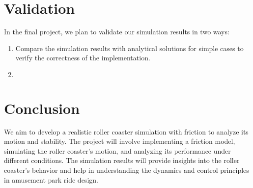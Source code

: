 \documentclass[12pt]{article}
\begin{document}
\section*{Validation}
In the final project, we plan to validate our simulation results in two ways:
\begin{enumerate}
    \item Compare the simulation results with analytical solutions for simple cases to verify the correctness of the implementation.
    \item 
\end{enumerate}

\section*{Conclusion}
We aim to develop a realistic roller coaster simulation with friction to analyze its motion and stability. The project will involve implementing a friction model, simulating the roller coaster's motion, and analyzing its performance under different conditions. The simulation results will provide insights into the roller coaster's behavior and help in understanding the dynamics and control principles in amusement park ride design.
\end{document}
